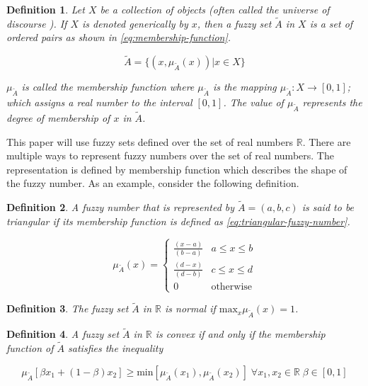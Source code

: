 \documentclass[ee,msthesis]{usuthesis}
\newtheorem{definition}{Definition}[section]
\begin{document}
\begin{definition}
Let \(X\) be a collection of objects (often called the universe of discourse \cite{bello-2019-fuzzy-activ}). If \(X\) is denoted
generically by \(x\), then a fuzzy set \(\tilde{A}\) in \(X\) is a set of ordered pairs as shown in \ref{eq:membership-function}.

\begin{equation}
\label{eq:membership-function}
\tilde{A} = \{(x, \mu_{\tilde{A}}(x))| x\in X\}
\end{equation}

\noindent
\(\mu_{\tilde{A}}\) is called the membership function where \(\mu_{\tilde{A}}\) is the mapping \(\mu_{\tilde{A}} : X \rightarrow
[0,1]\); which assigns a real number to the interval \([0,1]\). The value of \(\mu_{\tilde{A}}\) represents the degree of
membership of \(x\) in \(\tilde{A}\).
\end{definition}

This paper will use fuzzy sets defined over the set of real numbers \(\mathbb{R}\). There are multiple ways to represent fuzzy
numbers over the set of real numbers. The representation is defined by membership function which describes the shape of
the fuzzy number. As an example, consider the following definition.

\begin{definition}
A fuzzy number that is represented by \(\tilde{A} = (a,b,c)\) is said to be triangular if its membership function is
defined as \ref{eq:triangular-fuzzy-number}.

\begin{equation}
\label{eq:triangular-fuzzy-number}
  \mu_{\tilde{A}}(x) =
  \begin{cases}
    \frac{(x-a)}{(b-a)} & a \le x \le b \\
    \frac{(d-x)}{(d-b)} & c \le x \le d \\
    0                   & \text{otherwise}
  \end{cases}
\end{equation}
\end{definition}

\begin{definition}
The fuzzy set \(\tilde{A}\) in \(\mathbb{R}\) is normal if \(\text{max}_x \mu_{\tilde{A}}(x) = 1\).
\end{definition}

\begin{definition}
A fuzzy set \(\tilde{A}\) in \(\mathbb{R}\) is convex if and only if the membership function of \(\tilde{A}\) satisfies the inequality

\begin{equation*}
\mu_{\tilde{A}}[\beta x_1 + (1-\beta)x_2] \ge \text{min}[\mu_{\tilde{A}}(x_1), \mu_{\tilde{A}}(x_2)]\; \forall x_1, x_2 \in \mathbb{R}\; \beta \in [0,1]
\end{equation*}
\end{definition}
\end{document}
